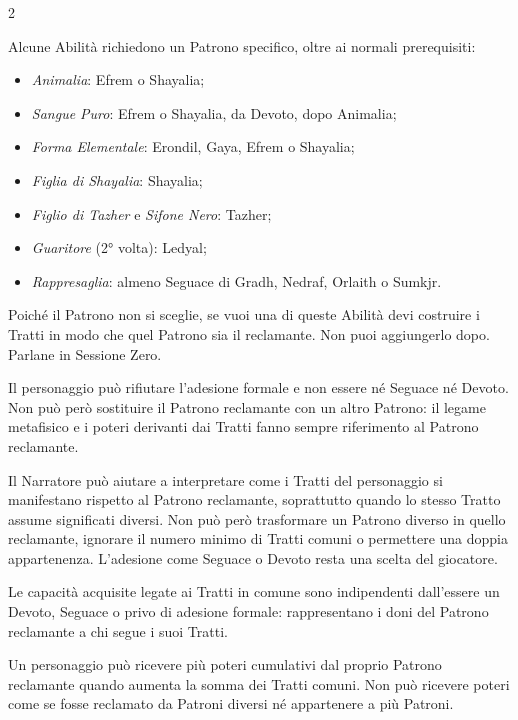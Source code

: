 \begin{multicols}{2}
\begin{giocatore}
Alcune Abilità richiedono un Patrono specifico, oltre ai normali prerequisiti:
\begin{itemize}[leftmargin=*] \setlength{\itemsep}{0pt}
\item \textit{Animalia}: Efrem o Shayalia;
\item \textit{Sangue Puro}: Efrem o Shayalia, da Devoto, dopo Animalia;
\item \textit{Forma Elementale}: Erondil, Gaya, Efrem o Shayalia;
\item \textit{Figlia di Shayalia}: Shayalia;
\item \textit{Figlio di Tazher} e \textit{Sifone Nero}: Tazher;
\item \textit{Guaritore} (2° volta): Ledyal;
\item \textit{Rappresaglia}: almeno Seguace di Gradh, Nedraf, Orlaith o Sumkjr.
\end{itemize}
Poiché il Patrono non si sceglie, se vuoi una di queste Abilità devi costruire i Tratti in modo che quel Patrono sia il reclamante. Non puoi aggiungerlo dopo. Parlane in Sessione Zero.
\end{giocatore}

Il personaggio può rifiutare l'adesione formale e non essere né Seguace né Devoto. Non può però sostituire il Patrono reclamante con un altro Patrono: il legame metafisico e i poteri derivanti dai Tratti fanno sempre riferimento al Patrono reclamante.


\begin{narratore}[Adattarsi]
Il Narratore può aiutare a interpretare come i Tratti del personaggio si manifestano rispetto al Patrono reclamante, soprattutto quando lo stesso Tratto assume significati diversi. Non può però trasformare un Patrono diverso in quello reclamante, ignorare il numero minimo di Tratti comuni o permettere una doppia appartenenza. L'adesione come Seguace o Devoto resta una scelta del giocatore.
\end{narratore}

Le capacità acquisite legate ai Tratti in comune sono indipendenti dall'essere un Devoto, Seguace o privo di adesione formale: rappresentano i doni del Patrono reclamante a chi segue i suoi Tratti.

Un personaggio può ricevere più poteri cumulativi dal proprio Patrono reclamante quando aumenta la somma dei Tratti comuni. Non può ricevere poteri come se fosse reclamato da Patroni diversi né appartenere a più Patroni. 



\end{multicols}
